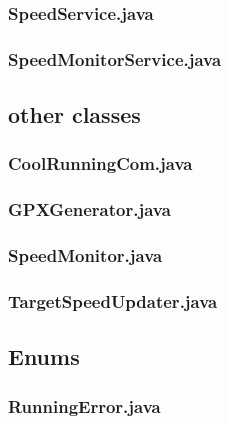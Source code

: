 \documentclass[11pt, titlepage ]{article}
\begin{document}
\subsubsection{SpeedService.java}

\subsubsection{SpeedMonitorService.java}


\clearpage

\subsection{other classes}
\subsubsection{CoolRunningCom.java}

\subsubsection{GPXGenerator.java}

\subsubsection{SpeedMonitor.java}

\subsubsection{TargetSpeedUpdater.java}


\clearpage

\subsection{Enums}
\subsubsection{RunningError.java}

\end{document}
